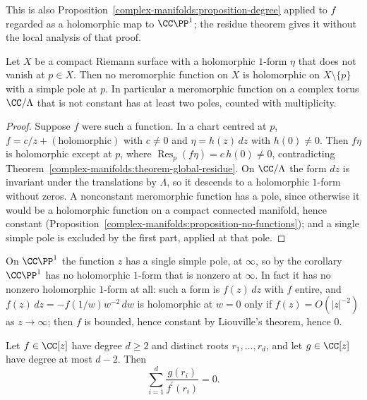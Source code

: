 This is also Proposition~\ref{complex-manifolds:proposition-degree} applied to $f$ regarded as a holomorphic map to $\CC\PP^1$; the residue theorem gives it without the local analysis of that proof.

\begin{corollary}\label{complex-manifolds:corollary-no-single-pole}
Let $X$ be a compact Riemann surface with a holomorphic $1$-form $\eta$ that does not vanish at $p \in X$. Then no meromorphic function on $X$ is holomorphic on $X \setminus \{p\}$ with a simple pole at $p$.
In particular a meromorphic function on a complex torus $\CC/\Lambda$ that is not constant has at least two poles, counted with multiplicity.
\end{corollary}

\begin{proof}
Suppose $f$ were such a function. In a chart centred at $p$, $f = c/z + (\text{holomorphic})$ with $c \neq 0$ and $\eta = h(z)\,dz$ with $h(0) \neq 0$. Then $f\eta$ is holomorphic except at $p$, where
$\operatorname{Res}_p(f\eta) = c\,h(0) \neq 0$, contradicting Theorem~\ref{complex-manifolds:theorem-global-residue}. On $\CC/\Lambda$ the form $dz$ is invariant under the translations by $\Lambda$, so it
descends to a holomorphic $1$-form without zeros. A nonconstant meromorphic function has a pole, since otherwise it would be a holomorphic function on a compact connected manifold, hence constant
(Proposition~\ref{complex-manifolds:proposition-no-functions}); and a single simple pole is excluded by the first part, applied at that pole.
\end{proof}

On $\CC\PP^1$ the function $z$ has a single simple pole, at $\infty$, so by the corollary $\CC\PP^1$ has no holomorphic $1$-form that is nonzero at $\infty$. In fact it has no nonzero holomorphic
$1$-form at all: such a form is $f(z)\,dz$ with $f$ entire, and $f(z)\,dz = -f(1/w)w^{-2}\,dw$ is holomorphic at $w = 0$ only if $f(z) = O(|z|^{-2})$ as $z \to \infty$; then $f$ is bounded, hence
constant by Liouville's theorem, hence $0$.

\begin{corollary}\label{complex-manifolds:corollary-euler-jacobi}
Let $f \in \CC[z]$ have degree $d \geq 2$ and distinct roots $r_1, \ldots, r_d$, and let $g \in \CC[z]$ have degree at most $d - 2$. Then
\[
\sum_{i=1}^d\frac{g(r_i)}{f^{\prime}(r_i)} = 0 .
\]
\end{corollary}

